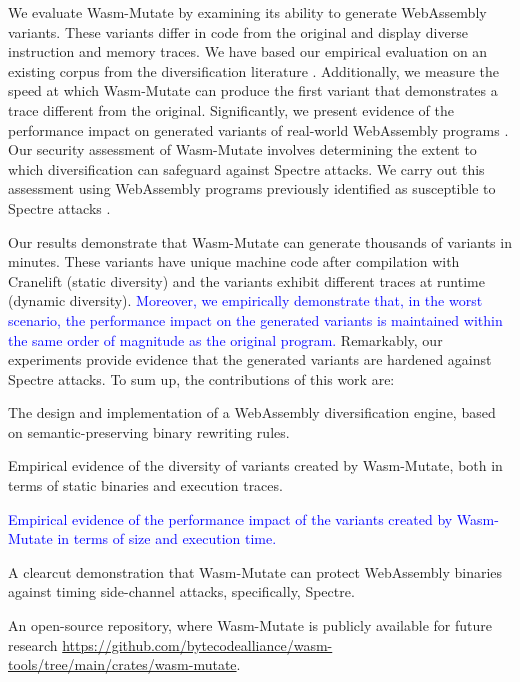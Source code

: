 \documentclass[a4paper,fleqn]{cas-dc}
\newcommand*\badge[1]{ \colorbox{red}{\color{white}#1}}
\newcommand{\tool}{{\sc Wasm-Mutate}\xspace}
\newcommand{\Wasm}{WebAssembly\xspace}
\newcommand{\wasm}{\Wasm}
\newenvironment{revision1}{\color{blue}}{}
\newcommand{\revision}[1]{\textcolor{blue}{#1}}
\newcommand{\repourl}{\url{https://github.com/bytecodealliance/wasm-tools/tree/main/crates/wasm-mutate}}
\newcommand{\todo}[1]{%
\refstepcounter{todo}
\noindent\textbf{\badge{TODO}} {\color{red}#1}
\addcontentsline{td}{todo}
{\color{red}\thesection.\thetodo\xspace #1}}
\begin{document}


\begin{revision1}
    
    We evaluate \tool by examining its ability to generate \Wasm variants.
    These variants differ in code from the original and display diverse instruction and memory traces.
    We have based our empirical evaluation on an existing corpus from the diversification literature \cite{arteaga2020crow, hilbig2021empirical, Swivel}.
    Additionally, we measure the speed at which \tool can produce the first variant that demonstrates a trace different from the original.
    Significantly, we present evidence of the performance impact on generated variants of real-world \Wasm programs \cite{hilbig2021empirical}.
    Our security assessment of \tool involves determining the extent to which diversification can safeguard against Spectre attacks. 
    We carry out this assessment using \wasm programs previously identified as susceptible to Spectre attacks \cite{Swivel}.
\end{revision1}


Our results demonstrate that \tool can generate thousands of variants in minutes. These variants have unique machine code after compilation with Cranelift (static diversity) and the variants exhibit different traces at runtime (dynamic diversity).
\revision{Moreover, we empirically demonstrate that, in the worst scenario, the performance impact on the generated variants is maintained within the same order of magnitude as the original program.}
Remarkably, our experiments provide evidence that the generated variants are hardened against Spectre attacks.
To sum up, the contributions of this work are:

\begin{itemize}
    \item The design and implementation of a \Wasm diversification engine, based on semantic-preserving binary rewriting rules.
    \item Empirical evidence of the diversity of variants created by \tool, both in terms of static binaries and execution traces.
    \revision{
        \item Empirical evidence of the performance impact of the variants created by \tool in terms of size and execution time.
    }
    \item A clearcut demonstration that \tool can protect \wasm binaries against timing side-channel attacks, specifically, Spectre.
    \item An open-source repository, where \tool is publicly available for future research \repourl.    
\end{itemize}
\end{document}
